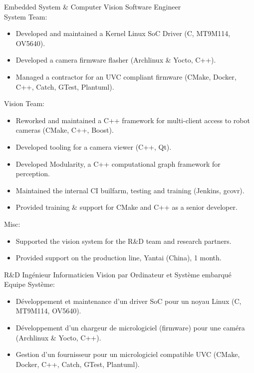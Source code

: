 \documentclass{article}
\begin{document}
\begin{llist}
 {
Embedded System \& Computer Vision Software Engineer \\
System Team:
\vspace{-0.50cm}
\begin{itemize}
	\item Developed and maintained a Kernel Linux SoC Driver (C, MT9M114, OV5640).
	\item Developed a camera firmware flasher (Archlinux \& Yocto, C++).
	\item Managed a contractor for an UVC compliant firmware (CMake, Docker, C++, Catch, GTest, Plantuml).
\end{itemize}
Vision Team:
\vspace{-0.50cm}
\begin{itemize}
	\item Reworked and maintained a C++ framework for multi-client access to robot cameras (CMake, C++, Boost).
	\item Developed tooling for a camera viewer (C++, Qt).
	\item Developed Modularity, a C++ computational graph framework for perception.
	\item Maintained the internal CI builfarm, testing and training (Jenkins,
		gcovr).
	\item Provided training \& support for CMake and C++ as a senior developer.
\end{itemize}
Misc:
\vspace{-0.50cm}
\begin{itemize}
	\item Supported the vision system for the R\&D team and research partners.
	\item Provided support on the production line, Yantai (China), 1 month.
\end{itemize}
} {
R\&D Ing\'{e}nieur Informaticien Vision par Ordinateur et Syst\`{e}me
embarqu\'{e} \\
Equipe Syst\`{e}me:
\vspace{-0.50cm}
\begin{itemize}
	\item D\'{e}veloppement et maintenance d'un driver SoC pour un noyau Linux (C, MT9M114, OV5640).
	\item D\'{e}veloppement d'un chargeur de micrologiciel (firmware) pour une cam\'{e}ra (Archlinux \& Yocto, C++).
	\item Gestion d'un fournisseur pour un micrologiciel compatible UVC (CMake, Docker, C++, Catch, GTest, Plantuml).

\end{itemize}}
\end{llist}
\end{document}

